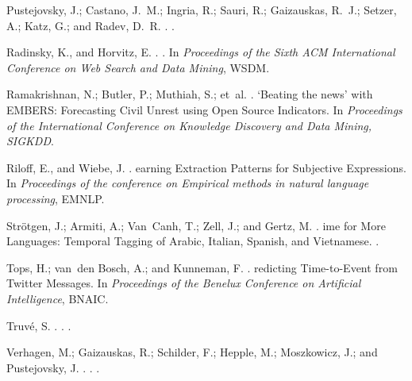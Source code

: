 \documentclass[letterpaper]{article}
\begin{document}
\begin{thebibliography}{}
Pustejovsky, J.; Castano, J.~M.; Ingria, R.; Sauri, R.; Gaizauskas, R.~J.;
  Setzer, A.; Katz, G.; and Radev, D.~R.
.
.

Radinsky, K., and Horvitz, E.
.
.
\newblock In {\em Proceedings of the Sixth ACM International Conference on Web
  Search and Data Mining}, WSDM.

Ramakrishnan, N.; Butler, P.; Muthiah, S.; et~al.
.
\newblock `{B}eating the news' with {E}{M}{B}{E}{R}{S}: {F}orecasting {C}ivil
  {U}nrest using {O}pen {S}ource {I}ndicators.
\newblock In {\em Proceedings of the International Conference on Knowledge
  Discovery and Data Mining, SIGKDD}.

Riloff, E., and Wiebe, J.
.
earning {E}xtraction {P}atterns for {S}ubjective {E}xpressions.
\newblock In {\em Proceedings of the conference on Empirical methods in natural
  language processing}, EMNLP.

Str{\"o}tgen, J.; Armiti, A.; Van~Canh, T.; Zell, J.; and Gertz, M.
.
ime for {M}ore {L}anguages: {T}emporal {T}agging of {A}rabic,
  {I}talian, {S}panish, and {V}ietnamese.
.

Tops, H.; van~den Bosch, A.; and Kunneman, F.
.
redicting {T}ime-to-{E}vent from {T}witter {M}essages.
\newblock In {\em Proceedings of the Benelux Conference on Artificial
  Intelligence}, BNAIC.

Truv{\'e}, S.
.
.
.

Verhagen, M.; Gaizauskas, R.; Schilder, F.; Hepple, M.; Moszkowicz, J.; and
  Pustejovsky, J.
.
.
.


\end{thebibliography}
\end{document}
